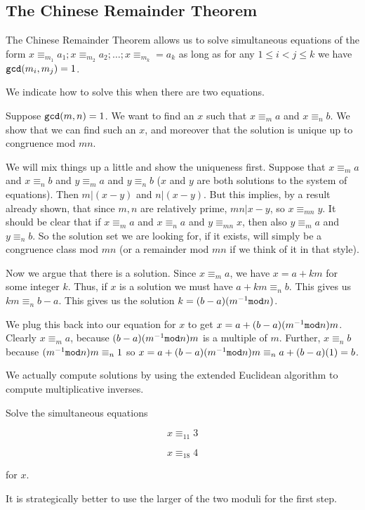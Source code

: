 \documentclass[12pt]{article}
\begin{document}
\newpage
\subsection{The Chinese Remainder Theorem}

The Chinese Remainder Theorem allows us to solve simultaneous equations of the form $x \equiv_{m_1} a_1; x \equiv_{m_2} a_2;\ldots;x \equiv_{m_k}=a_k$ as long as for any $1 \leq i<j \leq k$ we have ${\tt gcd}(m_i,m_j)=1$.

We indicate how to solve this when there are two equations.

Suppose ${\tt gcd}(m,n)=1$.  We want to find an $x$ such that $x \equiv_m a$ and $x \equiv_n b$.  We show that we can find such an $x$, and moreover that
the solution is unique up to congruence mod $mn$.

We will mix things up a little and show the uniqueness first.  Suppose that $x \equiv_m a$ and $x\equiv_n b$ and $y \equiv_m a$ and $y\equiv_n b$ ($x$ and $y$ are both solutions to the system of equations).  Then $m|(x-y)$ and $n|(x-y)$.  But this implies, by a result already shown, that since $m,n$ are relatively prime, $mn|x-y$, so
$x \equiv_{mn}y$.  It should be clear that if $x \equiv_m a$ and $x \equiv_n a$ and $y \equiv_{mn} x$, then also $y \equiv_m a$ and $y \equiv_n b$.  So the solution set we are looking for, if it exists, will simply be a congruence class mod $mn$ (or a remainder mod $mn$ if we think of it in that style).

Now we argue that there is a solution.  Since $x \equiv_m a$, we have $x=a+km$ for some integer $k$.  Thus, if $x$ is a solution we must
have $a+km \equiv_n b$.  This gives us $km \equiv_n b-a$.  This gives us the solution $k = (b-a)(m^{-1} {\tt mod} n)$.

We plug this back into our equation for $x$ to get $x = a+(b-a)(m^{-1}{\tt mod}n)m$.  Clearly $x \equiv_m a$, because $(b-a)(m^{-1}{\tt mod}n)m$ is a multiple of $m$.
Further, $x \equiv_n b$ because $(m^{-1}{\tt mod}n)m \equiv_n 1$ so $x = a+(b-a)(m^{-1}{\tt mod}n)m \equiv_n a+(b-a)(1) = b$.

We actually compute solutions by using the extended Euclidean algorithm to compute multiplicative inverses.

Solve the simultaneous equations 

$$x \equiv_{11} 3$$

$$x \equiv_{18} 4$$

for $x$.

It is strategically better to use the larger of the two moduli for the first step.
\end{document}
